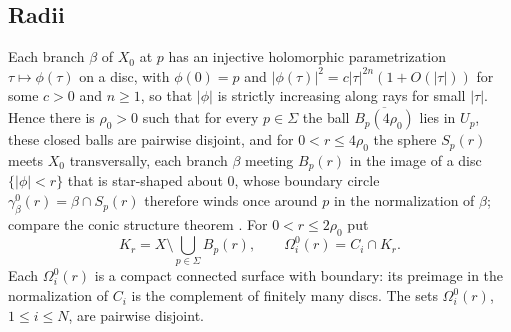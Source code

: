 \documentclass[11pt]{amsart}
\theoremstyle{definition}
\theoremstyle{remark}
\begin{document}
\subsection{Radii}
Each branch $\beta$ of $X_0$ at $p$ has an injective holomorphic
parametrization $\tau\mapsto\phi(\tau)$ on a disc, with $\phi(0)=p$ and
$|\phi(\tau)|^2=c|\tau|^{2n}(1+O(|\tau|))$ for some $c>0$ and $n\ge1$, so
that $|\phi|$ is strictly increasing along rays for small $|\tau|$. Hence
there is $\rho_0>0$ such that for every $p\in\Sigma$ the ball
$\overline{B_p(4\rho_0)}$ lies in $U_p$, these closed balls are pairwise
disjoint, and for $0<r\le4\rho_0$ the sphere $S_p(r)$ meets $X_0$
transversally, each branch $\beta$ meeting $B_p(r)$ in the image of a
disc $\{|\phi|<r\}$ that is star-shaped about $0$, whose boundary circle
$\gamma_\beta^0(r)=\beta\cap S_p(r)$ therefore winds once around $p$ in
the normalization of $\beta$; compare the conic structure theorem
\cite[Section~2]{milnor}. For $0<r\le2\rho_0$ put
\[
 K_r=X\setminus\bigcup_{p\in\Sigma}B_p(r),\qquad
 \Omega_i^0(r)=C_i\cap K_r .
\]
Each $\Omega_i^0(r)$ is a compact connected surface with boundary: its
preimage in the normalization of $C_i$ is the complement of finitely many
discs. The sets $\Omega^0_i(r)$, $1\le i\le N$, are pairwise disjoint.
\end{document}
